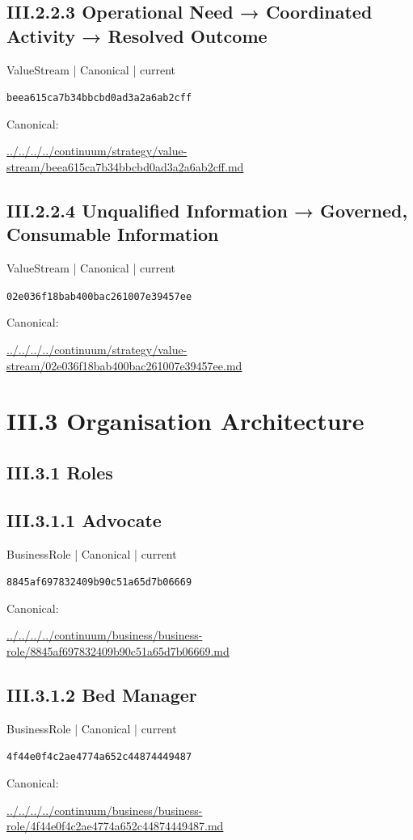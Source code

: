 \documentclass[10pt,a4paper]{article}
\begin{document}
\subsection*{III.2.2.3 Operational Need → Coordinated Activity → Resolved Outcome}
{\small ValueStream | Canonical | current}\par
\texttt{beea615ca7b34bbcbd0ad3a2a6ab2cff}\par
Canonical: \par
{\footnotesize\url{../../../../continuum/strategy/value-stream/beea615ca7b34bbcbd0ad3a2a6ab2cff.md}}\par
\subsection*{III.2.2.4 Unqualified Information → Governed, Consumable Information}
{\small ValueStream | Canonical | current}\par
\texttt{02e036f18bab400bac261007e39457ee}\par
Canonical: \par
{\footnotesize\url{../../../../continuum/strategy/value-stream/02e036f18bab400bac261007e39457ee.md}}\par
\section*{III.3 Organisation Architecture}
\subsection*{III.3.1 Roles}
\subsection*{III.3.1.1 Advocate}
{\small BusinessRole | Canonical | current}\par
\texttt{8845af697832409b90c51a65d7b06669}\par
Canonical: \par
{\footnotesize\url{../../../../continuum/business/business-role/8845af697832409b90c51a65d7b06669.md}}\par
\subsection*{III.3.1.2 Bed Manager}
{\small BusinessRole | Canonical | current}\par
\texttt{4f44e0f4c2ae4774a652c44874449487}\par
Canonical: \par
{\footnotesize\url{../../../../continuum/business/business-role/4f44e0f4c2ae4774a652c44874449487.md}}\par
\end{document}
